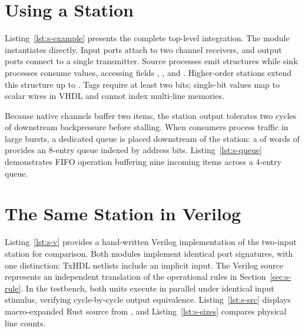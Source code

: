 \documentclass[journal,9pt]{IEEEtran}
\begin{document}
\section{Using a Station}
\label{sec:s-use}

Listing~\ref{lst:s-example} presents the complete top-level integration. The
module instantiates  directly. Input ports
attach to two channel receivers, and output ports connect to a single
transmitter. Source processes emit  structures while sink processes
consume  values, accessing fields , , and
. Higher-order stations extend this structure up to .
Tags require at least two bits; single-bit values map to scalar wires in VHDL
and cannot index multi-line memories.



Because native channels buffer two items, the station output tolerates two
cycles of downstream backpressure before stalling. When consumers process
traffic in large bursts, a dedicated  queue is placed downstream of
the station: a  of  words of
 provides an 8-entry queue indexed by
 address bits. Listing~\ref{lst:s-queue} demonstrates FIFO operation
buffering nine incoming items across a 4-entry queue.



\section{The Same Station in Verilog}
\label{sec:s-verilog}

Listing~\ref{lst:s-v} provides a hand-written Verilog implementation of the
two-input station for comparison. Both modules implement identical port
signatures, with one distinction: TxHDL netlists include an implicit 
input. The Verilog source represents an independent translation of the
operational rules in Section~\ref{sec:s-rule}. In the testbench, both units
execute in parallel under identical input stimulus, verifying cycle-by-cycle
output equivalence. Listing~\ref{lst:s-src} displays macro-expanded Rust source
from , and Listing~\ref{lst:s-sizes} compares physical line
counts.
\end{document}
